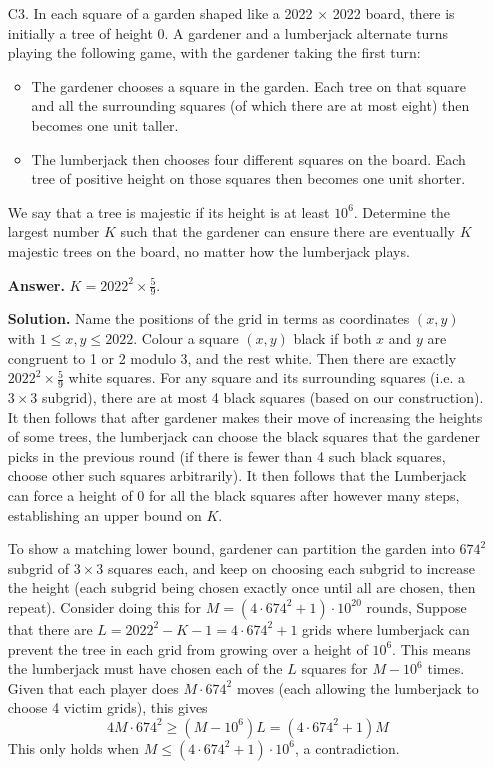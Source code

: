 \documentclass[11pt,a4paper]{article}
\begin{document}
\begin{enumerate}
    	\item[C3.]
    	In each square of a garden shaped like a 2022 $\times$ 2022 board, 
    	there is initially a tree of height 0. 
    	A gardener and a lumberjack alternate turns playing the following game, 
    	with the gardener taking the first turn:
    	\begin{itemize}
    		\item The gardener chooses a square in the garden. Each tree on that square and all the surrounding squares (of which there are at most eight) then becomes one unit taller. 
    		
    		\item The lumberjack then chooses four different squares on the board. Each tree of positive height on those squares then becomes one unit shorter.
    	\end{itemize}
    	We say that a tree is majestic if its height is at least $10^6$. 
    	Determine the largest number $K$ such that the gardener can ensure there are eventually $K$ majestic trees on the board, 
    	no matter how the lumberjack plays.
    	
    	\textbf{Answer.} $K=2022^2\times \frac 59$. 
    	
    	\textbf{Solution.} Name the positions of the grid in terms as coordinates $(x, y)$ with $1\le x, y\le 2022$. 
        Colour a square $(x, y)$ black if both $x$ and $y$ are congruent to 1 or 2 modulo 3, 
        and the rest white. 
        Then there are exactly $2022^2\times \frac 59$ white squares. 
        For any square and its surrounding squares (i.e. a $3\times 3$ subgrid), 
        there are at most 4 black squares (based on our construction). 
        It then follows that after gardener makes their move of increasing the heights of some trees, 
        the lumberjack can choose the black squares that the gardener picks in the previous round
        (if there is fewer than 4 such black squares, choose other such squares arbitrarily). 
        It then follows that the Lumberjack can force a height of 0 for all the black squares after however many steps, 
        establishing an upper bound on $K$. 
        
        To show a matching lower bound, gardener can partition the garden into $674^2$ subgrid of $3\times 3$ squares each, 
        and keep on choosing each subgrid to increase the height (each subgrid being chosen exactly once until all are chosen, then repeat). 
        Consider doing this for $M = (4\cdot 674^2 + 1)\cdot 10^{20}$ rounds, 
        Suppose that there are $L = 2022^2 - K - 1 = 4\cdot 674^2 + 1$ grids where lumberjack can prevent the tree in each grid from growing over a height of $10^6$. 
        This means the lumberjack must have chosen each of the $L$ squares for $M - 10^6$ times. 
        Given that each player does $M\cdot 674^2$ moves (each allowing the lumberjack to choose 4 victim grids), this gives 
        \[
        4M\cdot 674^2 \ge (M - 10^6)L = (4\cdot 674^2 + 1)M
        \]
        This only holds when $M \le (4\cdot 674^2 + 1)\cdot 10^6$, a contradiction. 
    	
    \end{enumerate}
    
\end{document}
